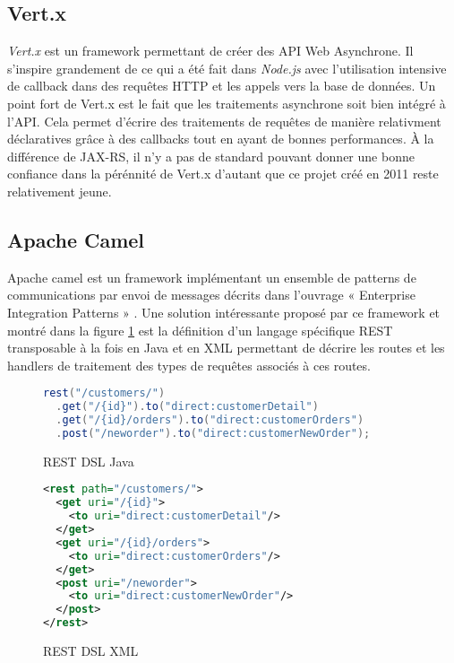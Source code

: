 \documentclass[a4paper, 11pt]{report}
\begin{document}
\subsection{Vert.x}

\emph{Vert.x} est un framework permettant de créer des API Web
Asynchrone.  Il s'inspire grandement de ce qui a été fait dans
\emph{Node.js} avec l'utilisation intensive de callback dans des
requêtes HTTP et les appels vers la base de données. Un point fort de
Vert.x est le fait que les traitements asynchrone soit bien intégré à
l'API. Cela permet d'écrire des traitements de requêtes de manière
relativment déclaratives grâce à des callbacks tout en ayant de bonnes
performances.  À la différence de JAX-RS, il n'y a pas de standard
pouvant donner une bonne confiance dans la pérénnité de Vert.x
d'autant que ce projet créé en 2011 reste relativement jeune.

\subsection{Apache Camel}

Apache camel est un framework implémentant un ensemble de patterns de
communications par envoi de messages décrits dans l'ouvrage «
Enterprise Integration Patterns » \cite{hohpe2003enterprise}. Une
solution intéressante proposé par ce framework et montré dans la
figure \ref{fig:restdsl} est la définition d'un langage spécifique
REST transposable à la fois en Java et en XML permettant de décrire
les routes et les handlers de traitement des types de requêtes
associés à ces routes.

\begin{figure}
  \ContinuedFloat*
  \begin{lstlisting}[language=java]
rest("/customers/")
  .get("/{id}").to("direct:customerDetail")
  .get("/{id}/orders").to("direct:customerOrders")
  .post("/neworder").to("direct:customerNewOrder");
  \end{lstlisting}
  \caption{REST DSL Java}
\end{figure}

\begin{figure}
  \ContinuedFloat
  \begin{lstlisting}[language=xml]
<rest path="/customers/">
  <get uri="/{id}">
    <to uri="direct:customerDetail"/>
  </get>
  <get uri="/{id}/orders">
    <to uri="direct:customerOrders"/>
  </get>
  <post uri="/neworder">
    <to uri="direct:customerNewOrder"/>
  </post>
</rest>
  \end{lstlisting}
  \caption{REST DSL XML}
  \label{fig:restdsl}
\end{figure}
\end{document}
